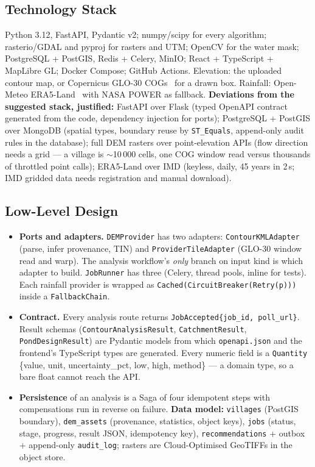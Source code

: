 \documentclass[manuscript,screen,review]{acmart}
\begin{document}
\subsection{Technology Stack}
Python 3.12, FastAPI, Pydantic v2; numpy/scipy for every algorithm; rasterio/GDAL and pyproj
for rasters and UTM; OpenCV for the water mask; PostgreSQL + PostGIS, Redis + Celery, MinIO;
React + TypeScript + MapLibre GL; Docker Compose; GitHub Actions.
Elevation: the uploaded contour map, or Copernicus GLO-30 COGs~\cite{copdem} for a drawn box.
Rainfall: Open-Meteo ERA5-Land~\cite{era5land} with NASA POWER as fallback.
\textbf{Deviations from the suggested stack, justified:} FastAPI over Flask (typed OpenAPI
contract generated from the code, dependency injection for ports); PostgreSQL + PostGIS over
MongoDB (spatial types, boundary reuse by \texttt{ST\_Equals}, append-only audit rules in the
database); full DEM rasters over point-elevation APIs (flow direction needs a grid ---
a village is $\sim$10\,000 cells, one COG window read versus thousands of throttled point
calls); ERA5-Land over IMD (keyless, daily, 45 years in 2\,s; IMD gridded data needs
registration and manual download).

\subsection{Low-Level Design}
{\sloppy
\begin{itemize}
\item \textbf{Ports and adapters.} \texttt{DEMProvider} has two adapters:
  \texttt{ContourKMLAdapter} (parse, infer provenance, TIN) and \texttt{ProviderTileAdapter}
  (GLO-30 window read and warp). The analysis workflow's \emph{only} branch on input kind is
  which adapter to build. \texttt{JobRunner} has three (Celery, thread pools, inline for
  tests). Each rainfall provider is wrapped as \texttt{Cached(CircuitBreaker(Retry(p)))}
  inside a \texttt{FallbackChain}.
\item \textbf{Contract.} Every analysis route returns \texttt{JobAccepted\{job\_id,
  poll\_url\}}. Result schemas (\texttt{ContourAnalysisResult}, \texttt{CatchmentResult},
  \texttt{PondDesignResult}) are Pydantic models from which \texttt{openapi.json} and the
  frontend's TypeScript types are generated. Every numeric field is a \texttt{Quantity}
  \{value, unit, uncertainty\_pct, low, high, method\} --- a domain type, so a bare float
  cannot reach the API.
\item \textbf{Persistence} of an analysis is a Saga of four idempotent steps with
  compensations run in reverse on failure. \textbf{Data model:} \texttt{villages} (PostGIS boundary), \texttt{dem\_assets}
  (provenance, statistics, object keys), \texttt{jobs} (status, stage, progress, result JSON,
  idempotency key), \texttt{recommendations} + outbox + append-only \texttt{audit\_log};
  rasters are Cloud-Optimised GeoTIFFs in the object store.
\end{itemize}\par}
\end{document}
